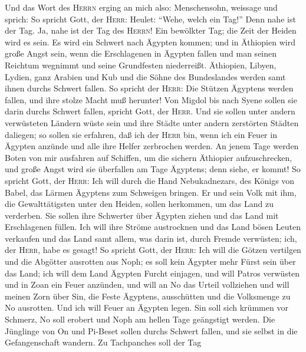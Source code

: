  Und das Wort des \textsc{Herrn} erging an mich also:
 Menschensohn, weissage und sprich: So spricht Gott, der
\textsc{Herr}: Heulet: ``Wehe, welch ein Tag!''  Denn nahe
ist der Tag. Ja, nahe ist der Tag des \textsc{Herrn}! Ein bewölkter Tag;
die Zeit der Heiden wird es sein.  Es wird ein Schwert
nach Ägypten kommen; und in Äthiopien wird große Angst sein, wenn die
Erschlagenen in Ägypten fallen und man seinen Reichtum wegnimmt und
seine Grundfesten niederreißt.  Äthiopien, Libyen, Lydien,
ganz Arabien und Kub und die Söhne des Bundeslandes werden samt ihnen
durchs Schwert fallen.  So spricht der \textsc{Herr}: Die
Stützen Ägyptens werden fallen, und ihre stolze Macht muß herunter! Von
Migdol bis nach Syene sollen sie darin durchs Schwert fallen, spricht
Gott, der \textsc{Herr}.  Und sie sollen unter andern
verwüsteten Ländern wüste sein und ihre Städte unter andern zerstörten
Städten daliegen;  so sollen sie erfahren, daß ich der
\textsc{Herr} bin, wenn ich ein Feuer in Ägypten anzünde und alle ihre
Helfer zerbrochen werden.  An jenem Tage werden Boten von
mir ausfahren auf Schiffen, um die sichern Äthiopier aufzuschrecken, und
große Angst wird sie überfallen am Tage Ägyptens; denn siehe, er kommt!
 So spricht Gott, der \textsc{Herr}: Ich will durch die
Hand Nebukadnezars, des Königs von Babel, das Lärmen Ägyptens zum
Schweigen bringen.  Er und sein Volk mit ihm, die
Gewalttätigsten unter den Heiden, sollen herkommen, um das Land zu
verderben. Sie sollen ihre Schwerter über Ägypten ziehen und das Land
mit Erschlagenen füllen.  Ich will ihre Ströme
austrocknen und das Land bösen Leuten verkaufen und das Land samt allem,
was darin ist, durch Fremde verwüsten; ich, der \textsc{Herr}, habe es
gesagt!  So spricht Gott, der \textsc{Herr}: Ich will die
Götzen vertilgen und die Abgötter ausrotten aus Noph; es soll kein
Ägypter mehr Fürst sein über das Land; ich will dem Land Ägypten Furcht
einjagen,  und will Patros verwüsten und in Zoan ein
Feuer anzünden, und will an No das Urteil vollziehen  und
will meinen Zorn über Sin, die Feste Ägyptens, ausschütten und die
Volksmenge zu No ausrotten.  Und ich will Feuer an
Ägypten legen. Sin soll sich krümmen vor Schmerz, No soll erobert und
Noph am hellen Tage geängstigt werden.  Die Jünglinge von
On und Pi-Beset sollen durchs Schwert fallen, und sie selbst in die
Gefangenschaft wandern.  Zu Tachpanches soll der Tag
